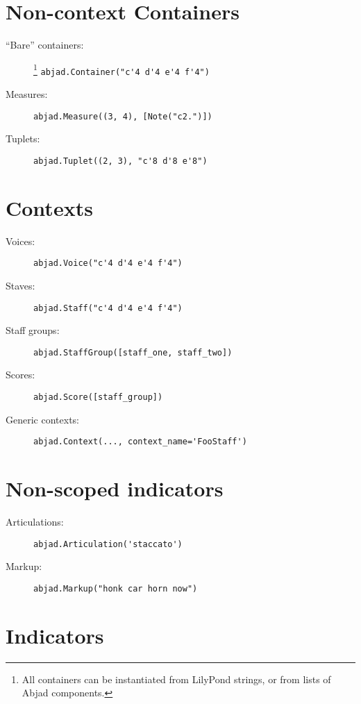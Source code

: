 \documentclass[a4paper]{tufte-handout}
\begin{document}
\section{Non-context Containers}

\begin{description}
    \item[\enquote{Bare} containers:]\footnote{%
        All containers can be instantiated from LilyPond strings, or from lists
        of Abjad components.}
        \hfill \verb|abjad.Container("c'4 d'4 e'4 f'4")|
    \item[Measures:]
        \hfill \verb|abjad.Measure((3, 4), [Note("c2.")])|
    \item[Tuplets:]
        \hfill \verb|abjad.Tuplet((2, 3), "c'8 d'8 e'8")|
\end{description}

\section{Contexts}

\begin{description}
    \item[Voices:]
        \hfill \verb|abjad.Voice("c'4 d'4 e'4 f'4")|
    \item[Staves:]
        \hfill \verb|abjad.Staff("c'4 d'4 e'4 f'4")|
    \item[Staff groups:]
        \hfill \verb|abjad.StaffGroup([staff_one, staff_two])|
    \item[Scores:]
        \hfill \verb|abjad.Score([staff_group])|
    \item[Generic contexts:]
        \hfill \verb|abjad.Context(..., context_name='FooStaff')|
\end{description}

\section{Non-scoped indicators}

\begin{description}
    \item[Articulations:]
        \hfill \verb|abjad.Articulation('staccato')|
    \item[Markup:]
        \hfill \verb|abjad.Markup("honk car horn now")|
\end{description}

\section{Indicators}
\end{document}
